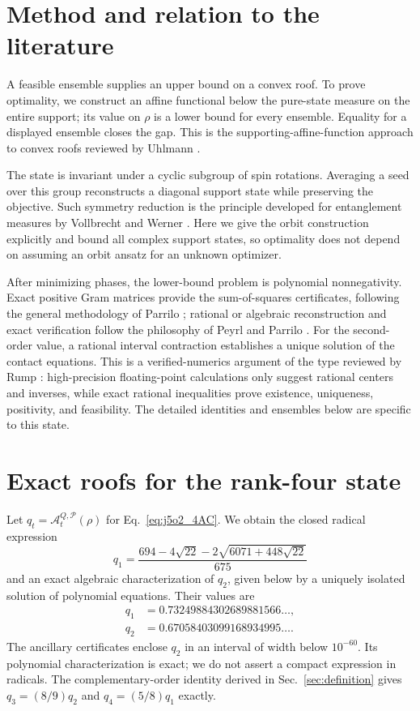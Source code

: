 \documentclass[11pt]{article}
\newcommand{\A}{\mathcal A}
\begin{document}
\section{Method and relation to the literature}
A feasible ensemble supplies an upper bound on a convex roof. To prove optimality, we construct an affine functional below the pure-state measure on the entire support; its value on $\rho$ is a lower bound for every ensemble. Equality for a displayed ensemble closes the gap. This is the supporting-affine-function approach to convex roofs reviewed by Uhlmann \cite{Uhlmann2010}.

The state is invariant under a cyclic subgroup of spin rotations. Averaging a seed over this group reconstructs a diagonal support state while preserving the objective. Such symmetry reduction is the principle developed for entanglement measures by Vollbrecht and Werner \cite{VollbrechtWerner2001}. Here we give the orbit construction explicitly and bound all complex support states, so optimality does not depend on assuming an orbit ansatz for an unknown optimizer.

After minimizing phases, the lower-bound problem is polynomial nonnegativity. Exact positive Gram matrices provide the sum-of-squares certificates, following the general methodology of Parrilo \cite{Parrilo2000}; rational or algebraic reconstruction and exact verification follow the philosophy of Peyrl and Parrilo \cite{PeyrlParrilo2008}. For the second-order value, a rational interval contraction establishes a unique solution of the contact equations. This is a verified-numerics argument of the type reviewed by Rump \cite{Rump2010}: high-precision floating-point calculations only suggest rational centers and inverses, while exact rational inequalities prove existence, uniqueness, positivity, and feasibility. The detailed identities and ensembles below are specific to this state.

\section{Exact roofs for the rank-four state}
\label{app:spin52_roofs}
Let $q_t=\A_t^{Q,\mathcal P}(\rho)$ for Eq.~\eqref{eq:j5o2_4AC}. We obtain the closed radical expression
\begin{equation}\label{eq:rank4_q1_exact}
 q_1=\frac{694-4\sqrt{22}-2\sqrt{6071+448\sqrt{22}}}{675}
\end{equation}
and an exact algebraic characterization of $q_2$, given below by a uniquely isolated solution of polynomial equations. Their values are
\begin{align}\label{eq:rank4_certified_roofs}
 q_1&=0.73249884302689881566\ldots,\\
 q_2&=0.67058403099168934995\ldots.\nonumber
\end{align}
The ancillary certificates enclose $q_2$ in an interval of width below $10^{-60}$. Its polynomial characterization is exact; we do not assert a compact expression in radicals. The complementary-order identity derived in Sec.~\ref{sec:definition} gives $q_3=(8/9)q_2$ and $q_4=(5/8)q_1$ exactly.
\end{document}
